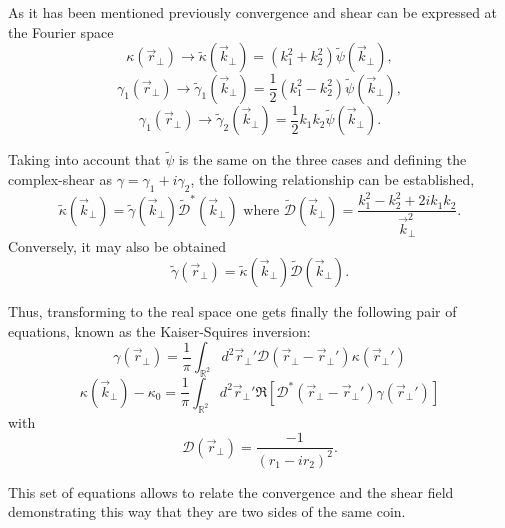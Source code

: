 As it has been mentioned previously convergence and shear can be expressed at the Fourier space 
\begin{equation}
\kappa(\vec r_\perp) \rightarrow \tilde\kappa(\vec k_\perp) = (k_1^2+k_2^2)\tilde\psi(\vec k_\perp),
\end{equation}
\begin{equation}
\gamma_1(\vec r_\perp) \rightarrow \tilde\gamma_1(\vec k_\perp) = \frac{1}{2}(k_1^2-k_2^2)\tilde\psi(\vec k_\perp),
\end{equation}
\begin{equation}
\gamma_1(\vec r_\perp) \rightarrow \tilde\gamma_2(\vec k_\perp) = \frac{1}{2}k_1k_2\tilde\psi(\vec k_\perp).
\end{equation}

Taking into account that $\tilde\psi$ is the same on the three cases and defining the complex-shear as $\gamma = \gamma_1+i\gamma_2$, the following relationship can be established,
\begin{equation}
\tilde\kappa(\vec k_\perp) = \tilde\gamma(\vec k_\perp)\mathcal{\tilde D}^*(\vec k_\perp)\mbox{ where }\mathcal{\tilde D}(\vec k_\perp) = \frac{k_1^2-k_2^2+2ik_1k_2}{\vec k_\perp^2}.
\end{equation}
Conversely, it may also be obtained
\begin{equation}
\tilde\gamma(\vec r_\perp) = \tilde\kappa(\vec k_\perp)\mathcal{\tilde D}(\vec k_\perp).
\end{equation}

Thus, transforming to the real space one gets finally the following pair of equations, known as the Kaiser-Squires inversion:
\begin{equation}
\gamma(\vec r_\perp) = \frac{1}{\pi}\int_{\mathbb{R}^2} d^2\vec r_\perp'\mathcal{D}(\vec r_\perp-\vec r_\perp')\kappa(\vec r_\perp')
\end{equation}
\begin{equation}
\kappa(\vec k_\perp)-\kappa_0 = \frac{1}{\pi}\int_{\mathbb{R}^2} d^2\vec r_\perp'\Re[\mathcal{D}^*(\vec r_\perp-\vec r_\perp')\gamma(\vec r_\perp')]
\end{equation}
with
\begin{equation}
\mathcal{D}(\vec r_\perp) = \frac{-1}{(r_1-ir_2)^2}.
\end{equation}

This set of equations allows to relate the convergence and the shear field demonstrating this way that they are two sides of the same coin.
